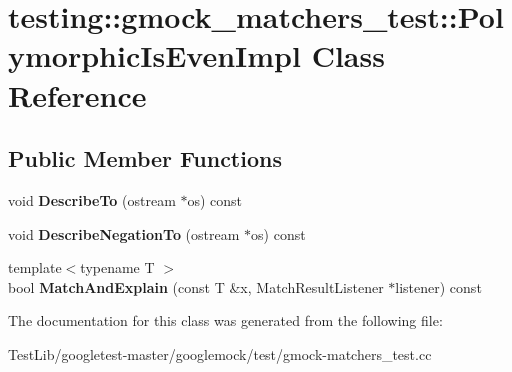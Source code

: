 \hypertarget{classtesting_1_1gmock__matchers__test_1_1PolymorphicIsEvenImpl}{}\section{testing\+:\+:gmock\+\_\+matchers\+\_\+test\+:\+:Polymorphic\+Is\+Even\+Impl Class Reference}
\label{classtesting_1_1gmock__matchers__test_1_1PolymorphicIsEvenImpl}
\subsection*{Public Member Functions}
\begin{DoxyCompactItemize}
\item 
\mbox{\label{classtesting_1_1gmock__matchers__test_1_1PolymorphicIsEvenImpl_ac07eb9f72db98b4b5489a139e844394c}} 
void {\bfseries Describe\+To} (ostream $\ast$os) const
\item 
\mbox{\label{classtesting_1_1gmock__matchers__test_1_1PolymorphicIsEvenImpl_a2e873630451f3cf6cad5bf6f82e00a33}} 
void {\bfseries Describe\+Negation\+To} (ostream $\ast$os) const
\item 
\mbox{\label{classtesting_1_1gmock__matchers__test_1_1PolymorphicIsEvenImpl_ab8d500c4d6c57645527fc367acf6189e}} 
{\footnotesize template$<$typename T $>$ }\\bool {\bfseries Match\+And\+Explain} (const T \&x, Match\+Result\+Listener $\ast$listener) const
\end{DoxyCompactItemize}


The documentation for this class was generated from the following file\+:\begin{DoxyCompactItemize}
\item 
Test\+Lib/googletest-\/master/googlemock/test/gmock-\/matchers\+\_\+test.\+cc\end{DoxyCompactItemize}
